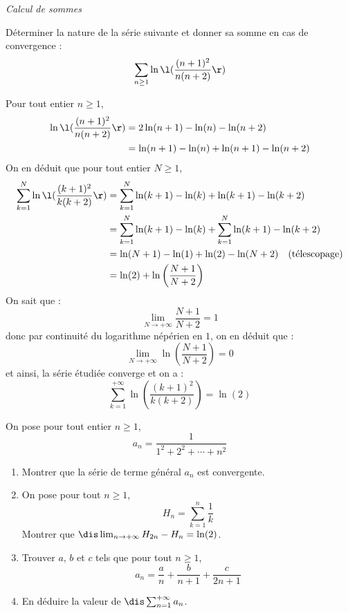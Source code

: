 \documentclass[a4paper,10pt]{report}
\begin{document}
\medskip

\begin{center}
\textit{{ {\large Calcul de sommes}}}
\end{center}

\medskip

\begin{Exa} Déterminer la nature de la série suivante et donner sa somme en cas de convergence : 
$$ \sum_{n \geq 1} \ln \l( \frac{(n+1)^2}{n(n+2)}\r)$$
\end{Exa}

\corr Pour tout entier $n \geq 1$,
\begin{align*}
\ln \l( \frac{(n+1)^2}{n(n+2)}\r) & = 2\ln(n+1)- \ln(n)- \ln(n+2) \\
& = \ln(n+1)-\ln(n) + \ln(n+1)-\ln(n+2)
\end{align*}
On en déduit que pour tout entier $N \geq 1$,
\begin{align*}
\sum_{k=1}^N \ln \l( \frac{(k+1)^2}{k(k+2)}\r) &= \sum_{k=1}^N \ln(k+1)-\ln(k) + \ln(k+1)-\ln(k+2) \\
& = \sum_{k=1}^N \ln(k+1)-\ln(k) + \sum_{k=1}^N \ln(k+1)-\ln(k+2) \\
& = \ln(N+1) - \ln(1) + \ln(2)- \ln(N+2) \quad \hbox{(télescopage)} \\
& = \ln(2) + \ln \left( \dfrac{N+1}{N+2} \right)
\end{align*}
On sait que :
$$ \lim_{N \rightarrow + \infty} \dfrac{N+1}{N+2}=1$$
donc par continuité du logarithme népérien en $1$, on en déduit que :
$$ \lim_{N \rightarrow + \infty} \ln \left( \dfrac{N+1}{N+2} \right)=0$$
et ainsi, la série étudiée converge et on a :
$$ \sum_{k=1}^{+ \infty} \ln \left( \dfrac{(k+1)^2}{k(k+2)} \right) = \ln(2) $$


\medskip

\begin{Exa} On pose pour tout entier $n \geq 1$,
$$ a_n = \dfrac{1}{1^2+2^2 + \cdots + n^2}$$
\begin{enumerate}
\item Montrer que la série de terme général $a_n$ est convergente.
\item On pose pour tout $n \geq 1$,
$$ H_n = \sum_{k=1}^n \dfrac{1}{k}$$
Montrer que $\dis \lim_{n \rightarrow + \infty} H_{2n}-H_n = \ln(2)$.
\item Trouver $a$, $b$ et $c$ tels que pour tout $n \geq 1$,
$$ a_n = \dfrac{a}{n} + \dfrac{b}{n+1} + \dfrac{c}{2n+1}$$
\item En déduire la valeur de $\dis \sum_{n=1}^{+ \infty} a_n$.
\end{enumerate}
\end{Exa}
\end{document}
